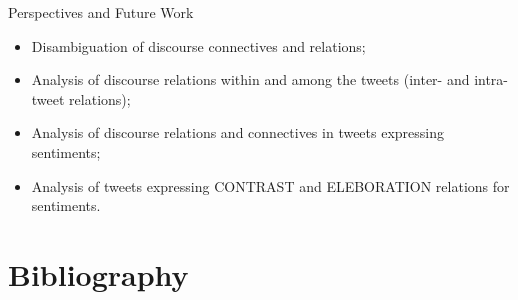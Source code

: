 \documentclass{beamer}
\begin{document}
    \begin{frame}{Perspectives and Future Work}
      \begin{itemize}
        \item Disambiguation of discourse connectives and relations;
        \item Analysis of discourse relations within and among the
          tweets (inter- and intra-tweet relations);
        \item Analysis of discourse relations and connectives in tweets expressing sentiments;
        \item Analysis of tweets expressing CONTRAST and ELEBORATION relations for sentiments.
      \end{itemize}
    \end{frame}

    \section*{Bibliography}
    
    
    
\end{document}
